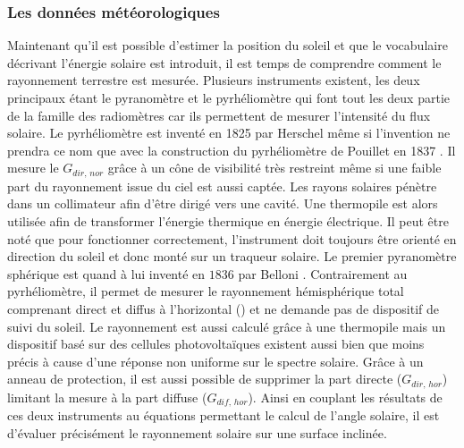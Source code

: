 \subsubsection{Les données météorologiques} %
\label{ssub:les_donnees_meteorologiques}
Maintenant qu’il est possible d’estimer la position du soleil et que le vocabulaire
décrivant l’énergie solaire est introduit, il est temps de comprendre comment
le rayonnement terrestre est mesurée. Plusieurs instruments existent, les deux principaux
étant le pyranomètre et le pyrhéliomètre qui font tout les deux partie de la famille
des radiomètres car ils permettent de mesurer l’intensité du flux solaire.
Le pyrhéliomètre est inventé en 1825 par Herschel \parencite{Kutz2013} même si l’invention
ne prendra ce nom que avec la construction du pyrhéliomètre de Pouillet en 1837 \parencite{Boer1985}.
Il mesure le $G_{dir,\,nor}$ grâce à un cône de visibilité très
restreint même si une faible part du rayonnement issue du ciel est aussi captée.
Les rayons solaires pénètre dans un collimateur afin d’être dirigé vers une cavité.
Une thermopile est alors utilisée afin de transformer l’énergie thermique en énergie électrique.
Il peut être noté que pour fonctionner correctement, l’instrument doit toujours être orienté
en direction du soleil et donc monté sur un traqueur solaire.
Le premier pyranomètre sphérique est quand à lui inventé en $1836$ par Belloni \parencite{Boer1985}.
Contrairement au pyrhéliomètre, il permet de mesurer le rayonnement hémisphérique total
comprenant direct et diffus à l’horizontal () et ne demande pas de dispositif de
suivi du soleil. Le rayonnement est aussi calculé grâce à une thermopile mais un
dispositif basé sur des cellules photovoltaïques existent aussi bien que moins précis
à cause d’une réponse non uniforme sur le spectre solaire. Grâce à un anneau de protection,
il est aussi possible de supprimer la part directe ($G_{dir,\,hor}$) limitant la mesure
à la part diffuse ($G_{dif,\,hor}$). Ainsi en couplant les résultats de ces deux instruments
au équations permettant le calcul de l’angle solaire, il est d’évaluer précisément le
rayonnement solaire sur une surface inclinée.


